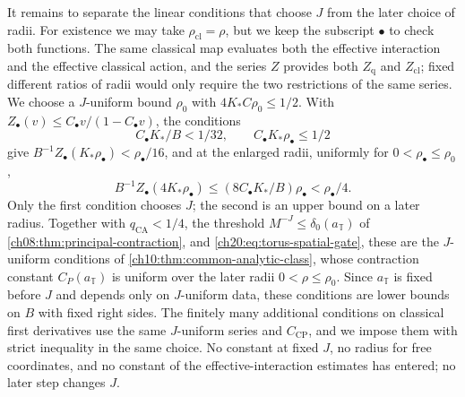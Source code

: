 It remains to separate the linear conditions that choose $J$ from the later choice of radii. For existence we may take $\rho_{\mathrm{cl}}=\rho$, but we keep the subscript $\bullet$ to check both functions. The same classical map evaluates both the effective interaction and the effective classical action, and the series $Z$ provides both $Z_{\mathrm q}$ and $Z_{\mathrm{cl}}$; fixed different ratios of radii would only require the two restrictions of the same series. We choose a $J$-uniform bound $\rho_0$ with $4K_*C\rho_0\le1/2$. With $Z_\bullet(v)\le C_\bullet v/(1-C_\bullet v)$, the conditions
\[
 C_\bullet K_*/B<1/32,\qquad C_\bullet K_*\rho_\bullet\le1/2
\]
give $B^{-1}Z_\bullet(K_*\rho_\bullet)<\rho_\bullet/16$, and at the enlarged radii, uniformly for $0<\rho_\bullet\le\rho_0$,
\begin{equation}\label{ch20:eq:torus-enlarged-center}
 B^{-1}Z_\bullet(4K_*\rho_\bullet)\le(8C_\bullet K_*/B)\rho_\bullet<\rho_\bullet/4.
\end{equation}
Only the first condition chooses $J$; the second is an upper bound on a later radius. Together with $q_{\mathrm{CA}}<1/4$, the threshold $M^{-J}\le\delta_0(a_{\mathbb T})$ of \cref{ch08:thm:principal-contraction}, and \eqref{ch20:eq:torus-spatial-gate}, these are the $J$-uniform conditions of \cref{ch10:thm:common-analytic-class}, whose contraction constant $C_P(a_{\mathbb T})$ is uniform over the later radii $0<\rho\le\rho_0$. Since $a_{\mathbb T}$ is fixed before $J$ and depends only on $J$-uniform data, these conditions are lower bounds on $B$ with fixed right sides. The finitely many additional conditions on classical first derivatives use the same $J$-uniform series and $C_{\mathrm{CP}}$, and we impose them with strict inequality in the same choice. No constant at fixed $J$, no radius for free coordinates, and no constant of the effective-interaction estimates has entered; no later step changes $J$.

